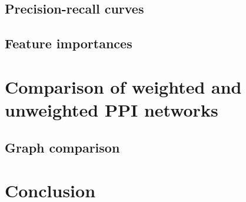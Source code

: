 \subsection{Precision-recall curves}




\subsection{Feature importances}




\section{Comparison of weighted and unweighted PPI networks}




\subsection{Graph comparison}


\section*{Conclusion}


